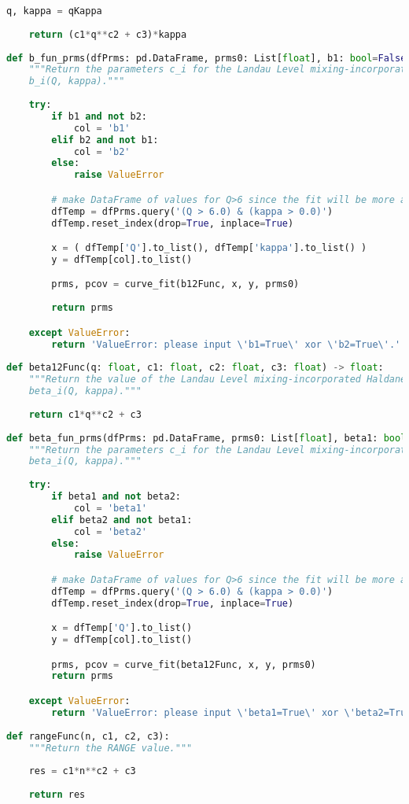 \begin{lstlisting}[language=Python]
    q, kappa = qKappa
    
    return (c1*q**c2 + c3)*kappa
    
def b_fun_prms(dfPrms: pd.DataFrame, prms0: List[float], b1: bool=False, b2: bool=False) -> np.ndarray:
    """Return the parameters c_i for the Landau Level mixing-incorporated Haldane pseudopotential parameter function 
    b_i(Q, kappa)."""
    
    try:
        if b1 and not b2:
            col = 'b1'
        elif b2 and not b1:
            col = 'b2'
        else:
            raise ValueError

        # make DataFrame of values for Q>6 since the fit will be more accurate and we are interested in the therm lim
        dfTemp = dfPrms.query('(Q > 6.0) & (kappa > 0.0)')
        dfTemp.reset_index(drop=True, inplace=True)

        x = ( dfTemp['Q'].to_list(), dfTemp['kappa'].to_list() )
        y = dfTemp[col].to_list()

        prms, pcov = curve_fit(b12Func, x, y, prms0)
        
        return prms

    except ValueError:
        return 'ValueError: please input \'b1=True\' xor \'b2=True\'.'
        
def beta12Func(q: float, c1: float, c2: float, c3: float) -> float:
    """Return the value of the Landau Level mixing-incorporated Haldane pseudopotential parameter function
    beta_i(Q, kappa)."""
    
    return c1*q**c2 + c3
    
def beta_fun_prms(dfPrms: pd.DataFrame, prms0: List[float], beta1: bool=False, beta2: bool=False) -> np.ndarray:
    """Return the parameters c_i for the Landau Level mixing-incorporated Haldane pseudopotential parameter function
    beta_i(Q, kappa)."""
    
    try:
        if beta1 and not beta2:
            col = 'beta1'
        elif beta2 and not beta1:
            col = 'beta2'
        else:
            raise ValueError

        # make DataFrame of values for Q>6 since the fit will be more accurate and we are interested in the therm lim
        dfTemp = dfPrms.query('(Q > 6.0) & (kappa > 0.0)')
        dfTemp.reset_index(drop=True, inplace=True)

        x = dfTemp['Q'].to_list()
        y = dfTemp[col].to_list()

        prms, pcov = curve_fit(beta12Func, x, y, prms0)
        return prms

    except ValueError:
        return 'ValueError: please input \'beta1=True\' xor \'beta2=True\'.'
        
def rangeFunc(n, c1, c2, c3):
    """Return the RANGE value."""
    
    res = c1*n**c2 + c3
    
    return res
\end{lstlisting}
    
\singlespacing